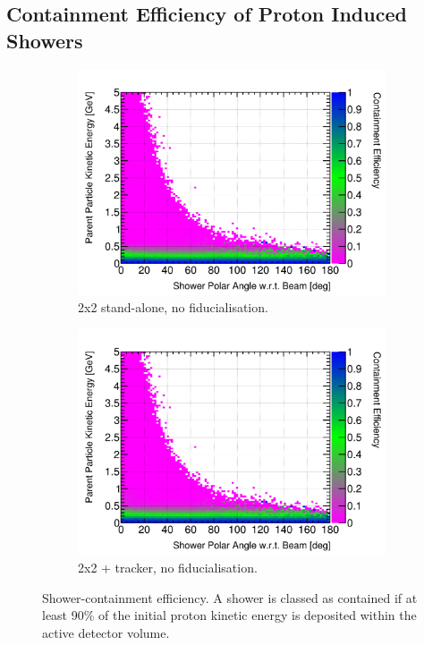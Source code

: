 \documentclass[10pt,a4paper,openany]{article}
\begin{document}
\subsection{Containment Efficiency of Proton Induced Showers}
\begin{figure}[!htb]
	\centering
	\begin{subfigure}[b]{0.49\textwidth}
		\centering
		\includegraphics[width=1.0\textwidth]{P_cont_eff_2x2.png}
		\caption{2x2 stand-alone, no fiducialisation.}
		\label{}
	\end{subfigure}	
	\hfill
	\begin{subfigure}[b]{0.49\textwidth}
		\centering
		\includegraphics[width=1.0\textwidth]{P_cont_eff_2x2_Scintillator_gap.png}
		\caption{2x2 + tracker, no fiducialisation.}
		\label{}
	\end{subfigure}	
	\caption{Shower-containment efficiency. A shower is classed as contained if at least 90\% of the initial proton kinetic energy is deposited within the active detector volume.}
\end{figure}
\end{document}
